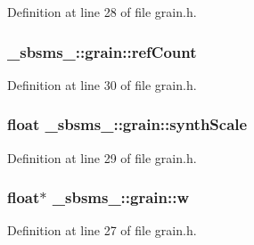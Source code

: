 Definition at line 28 of file grain.\+h.

\subsubsection[{\texorpdfstring{ref\+Count}{refCount}}]{ \+\_\+sbsms\+\_\+\+::grain\+::ref\+Count\hspace{0.3cm}{\ttfamily [protected]}}\hypertarget{class__sbsms___1_1grain_ad2509f613840dc95c162c28c3fc9b204}{}\label{class__sbsms___1_1grain_ad2509f613840dc95c162c28c3fc9b204}


Definition at line 30 of file grain.\+h.

\subsubsection[{\texorpdfstring{synth\+Scale}{synthScale}}]{\setlength{\rightskip}{0pt plus 5cm}float \+\_\+sbsms\+\_\+\+::grain\+::synth\+Scale\hspace{0.3cm}{\ttfamily [protected]}}\hypertarget{class__sbsms___1_1grain_af52d60aff66b343ce32de1884d43c8b8}{}\label{class__sbsms___1_1grain_af52d60aff66b343ce32de1884d43c8b8}


Definition at line 29 of file grain.\+h.

\subsubsection[{\texorpdfstring{w}{w}}]{\setlength{\rightskip}{0pt plus 5cm}float$\ast$ \+\_\+sbsms\+\_\+\+::grain\+::w\hspace{0.3cm}{\ttfamily [protected]}}\hypertarget{class__sbsms___1_1grain_ae4951d89820eaed1fde21b9fbd8e7b4d}{}\label{class__sbsms___1_1grain_ae4951d89820eaed1fde21b9fbd8e7b4d}


Definition at line 27 of file grain.\+h.

